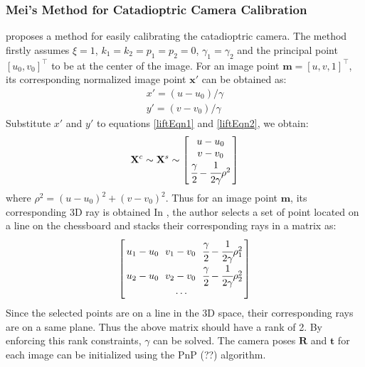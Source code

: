 \documentclass{report}
\begin{document}
\subsubsection{Mei's Method for Catadioptric Camera Calibration}
\cite{mei2007single} proposes a method for easily calibrating the catadioptric camera. The method firstly assumes $\xi = 1$, $k_1 = k_2 = p_1 = p_2 = 0$, $\gamma_1 = \gamma_2$ and the principal point $[u_0, v_0]^\top$ to be at the center of the image. For an image point $\mathbf{m} = [u, v, 1]^\top$, its corresponding normalized image point $\mathbf{x}'$ can be obtained as:
\begin{eqnarray}
x' = (u - u_0) / \gamma \\
y' = (v - v_0) / \gamma
\end{eqnarray}
Substitute $x'$ and $y'$ to equations \ref{liftEqn1} and \ref{liftEqn2}, we obtain: 
\begin{equation}
\mathbf{X}^c \sim \mathbf{X}^s \sim
\arraycolsep=1.5pt%
\begin{bmatrix}
	\begin{array}{c}
	u - u_0 \\ v - v_0 \\ \cfrac{\gamma}{2} - \cfrac{1}{2 \gamma} \rho^2
	\end{array}
\end{bmatrix} 
\label{meiRayEqn}
\end{equation}
where $\rho^2 = (u - u_0)^2 + (v - v_0)^2$. Thus for an image point $\mathbf{m}$, its corresponding 3D ray is obtained In \cite{mei2007single}, the author selects a set of point located on a line on the chessboard and stacks their corresponding rays in a matrix as:
\begin{equation}
\arraycolsep=1.5pt%
\begin{bmatrix}
	\begin{array}{ccc}
	u_1 - u_0\  & v_1 - v_0\  & \cfrac{\gamma}{2} - \cfrac{1}{2 \gamma} \rho_1^2 \\
	u_2 - u_0\  & v_2 - v_0\  & \cfrac{\gamma}{2} - \cfrac{1}{2 \gamma} \rho_2^2 \\
	&\cdots	&
	\end{array}
\end{bmatrix} 
\end{equation}  
Since the selected points are on a line in the 3D space, their corresponding rays are on a same plane. Thus the above matrix should have a rank of 2. By enforcing this rank constraints, $\gamma$ can be solved. The camera poses $\mathbf{R}$ and $\mathbf{t}$ for each image can be initialized using the PnP (??) \cite{} algorithm. 
\end{document}
